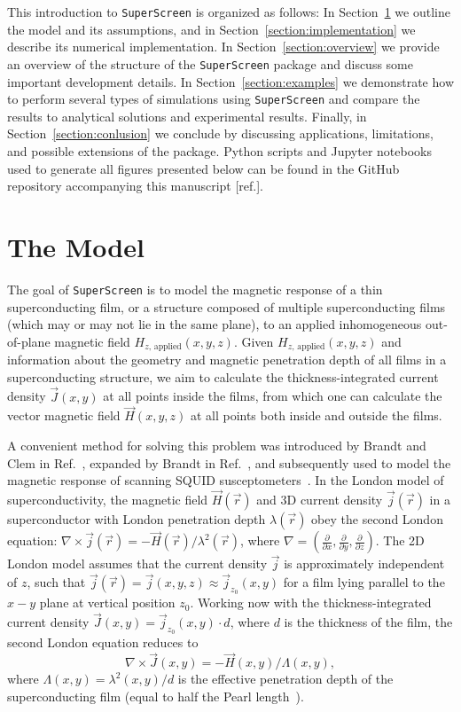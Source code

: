 \documentclass[final,3p,times,twocolumn]{elsarticle}
\newcommand{\inline}[1]{\texttt{#1}\xspace}
\newcommand{\SuperScreen}{\inline{SuperScreen}}
\newcounter{bla}
\begin{document}
This introduction to \SuperScreen is organized as follows: In Section~\ref{section:model} we outline the model and its assumptions, and in Section~\ref{section:implementation} we describe its numerical implementation. In Section~\ref{section:overview} we provide an overview of the structure of the \SuperScreen package and discuss some important development details. In Section~\ref{section:examples} we demonstrate how to perform several types of simulations using \SuperScreen and compare the results to analytical solutions and experimental results. Finally, in Section~\ref{section:conlusion} we conclude by discussing applications, limitations, and possible extensions of the package. Python scripts and Jupyter notebooks used to generate all figures presented below can be found in the GitHub repository accompanying this manuscript [ref.].

\section{The Model}
\label{section:model}

The goal of \SuperScreen is to model the magnetic response of a thin superconducting film, or a structure composed of multiple superconducting films (which may or may not lie in the same plane), to an applied inhomogeneous out-of-plane magnetic field
$H_{z,\,\mathrm{applied}}(x, y, z)$. Given $H_{z,\,\mathrm{applied}}(x, y, z)$ and information about the geometry and magnetic penetration depth of all films in a superconducting structure, we aim to calculate the thickness-integrated current density $\vec{J}(x, y)$ at all points inside the films, from which one can calculate the vector magnetic field $\vec{H}(x, y, z)$ at all points both inside and outside the films.

A convenient method for solving this problem was introduced by Brandt and Clem in Ref.~\cite{Brandt2004-ew}, expanded by Brandt in Ref.~\cite{Brandt2005-wj}, and subsequently used to model the magnetic response of scanning SQUID susceptometers~\cite{Kirtley2016-zz, Kirtley2016-gt}. In the London model of superconductivity, the magnetic field $\vec{H}(\vec{r})$ and 3D current density $\vec{j}(\vec{r})$ in a superconductor with London penetration depth $\lambda(\vec{r})$ obey the second London equation:
$\nabla\times\vec{j}(\vec{r})=-\vec{H}(\vec{r})/\lambda^2(\vec{r})$, where
$\nabla=\left(\frac{\partial}{\partial x}, \frac{\partial}{\partial y}, \frac{\partial}{\partial z}\right)$. The 2D London model assumes that the current density $\vec{j}$ is approximately independent of $z$, such that  $\vec{j}(\vec{r}) = \vec{j}(x, y, z)\approx\vec{j}_{z_0}(x, y)$ for a film lying parallel to the $x-y$ plane at vertical position $z_0$. Working now with the thickness-integrated current density $\vec{J}(x, y)=\vec{j}_{z_0}(x, y)\cdot d$, where $d$
is the thickness of the film, the second London equation reduces to
\begin{equation}
    \label{eq:london}
    \nabla\times\vec{J}(x, y)=-\vec{H}(x, y)/\Lambda(x, y),
\end{equation}
where $\Lambda(x, y)=\lambda^2(x, y)/d$ is the effective penetration depth
of the superconducting film (equal to half the Pearl length~\cite{Pearl1964-cl}).
\end{document}
